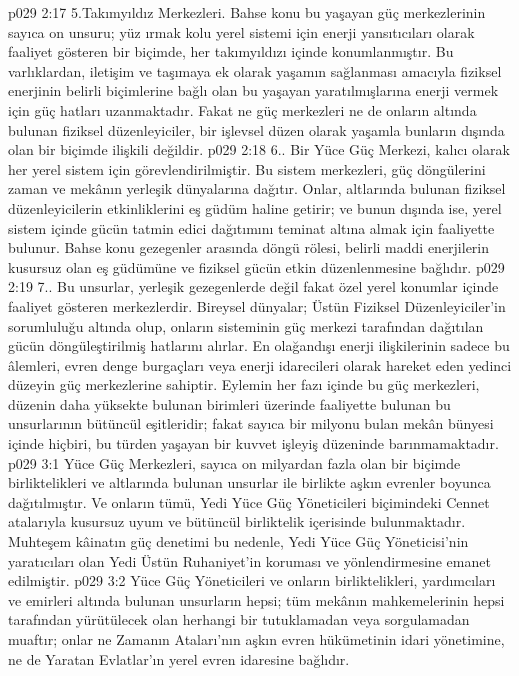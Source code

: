 \vs p029 2:17 5.\bibnobreakspace Takımyıldız Merkezleri. Bahse konu bu yaşayan güç merkezlerinin sayıca on unsuru; yüz ırmak kolu yerel sistemi için enerji yansıtıcıları olarak faaliyet gösteren bir biçimde, her takımyıldızı içinde konumlanmıştır. Bu varlıklardan, iletişim ve taşımaya ek olarak yaşamın sağlanması amacıyla fiziksel enerjinin belirli biçimlerine bağlı olan bu yaşayan yaratılmışlarına enerji vermek için güç hatları uzanmaktadır. Fakat ne güç merkezleri ne de onların altında bulunan fiziksel düzenleyiciler, bir işlevsel düzen olarak yaşamla bunların dışında olan bir biçimde ilişkili değildir.
\vs p029 2:18 6.\bibnobreakspace {}. Bir Yüce Güç Merkezi, kalıcı olarak her yerel sistem için görevlendirilmiştir. Bu sistem merkezleri, güç döngülerini zaman ve mekânın yerleşik dünyalarına dağıtır. Onlar, altlarında bulunan fiziksel düzenleyicilerin etkinliklerini eş güdüm haline getirir; ve bunun dışında ise, yerel sistem içinde gücün tatmin edici dağıtımını teminat altına almak için faaliyette bulunur. Bahse konu gezegenler arasında döngü rölesi, belirli maddi enerjilerin kusursuz olan eş güdümüne ve fiziksel gücün etkin düzenlenmesine bağlıdır.
\vs p029 2:19 7.\bibnobreakspace {}. Bu unsurlar, yerleşik gezegenlerde değil fakat özel yerel konumlar içinde faaliyet gösteren merkezlerdir. Bireysel dünyalar; Üstün Fiziksel Düzenleyiciler’in sorumluluğu altında olup, onların sisteminin güç merkezi tarafından dağıtılan gücün döngüleştirilmiş hatlarını alırlar. En olağandışı enerji ilişkilerinin sadece bu âlemleri, evren denge burgaçları veya enerji idarecileri olarak hareket eden yedinci düzeyin güç merkezlerine sahiptir. Eylemin her fazı içinde bu güç merkezleri, düzenin daha yüksekte bulunan birimleri üzerinde faaliyette bulunan bu unsurlarının bütüncül eşitleridir; fakat sayıca bir milyonu bulan mekân bünyesi içinde hiçbiri, bu türden yaşayan bir kuvvet işleyiş düzeninde barınmamaktadır.
\vs p029 3:1 Yüce Güç Merkezleri, sayıca on milyardan fazla olan bir biçimde birliktelikleri ve altlarında bulunan unsurlar ile birlikte aşkın evrenler boyunca dağıtılmıştır. Ve onların tümü, Yedi Yüce Güç Yöneticileri biçimindeki Cennet atalarıyla kusursuz uyum ve bütüncül birliktelik içerisinde bulunmaktadır. Muhteşem kâinatın güç denetimi bu nedenle, Yedi Yüce Güç Yöneticisi’nin yaratıcıları olan Yedi Üstün Ruhaniyet’in koruması ve yönlendirmesine emanet edilmiştir.
\vs p029 3:2 Yüce Güç Yöneticileri ve onların birliktelikleri, yardımcıları ve emirleri altında bulunan unsurların hepsi; tüm mekânın mahkemelerinin hepsi tarafından yürütülecek olan herhangi bir tutuklamadan veya sorgulamadan muaftır; onlar ne Zamanın Ataları’nın aşkın evren hükümetinin idari yönetimine, ne de Yaratan Evlatlar’ın yerel evren idaresine bağlıdır.
